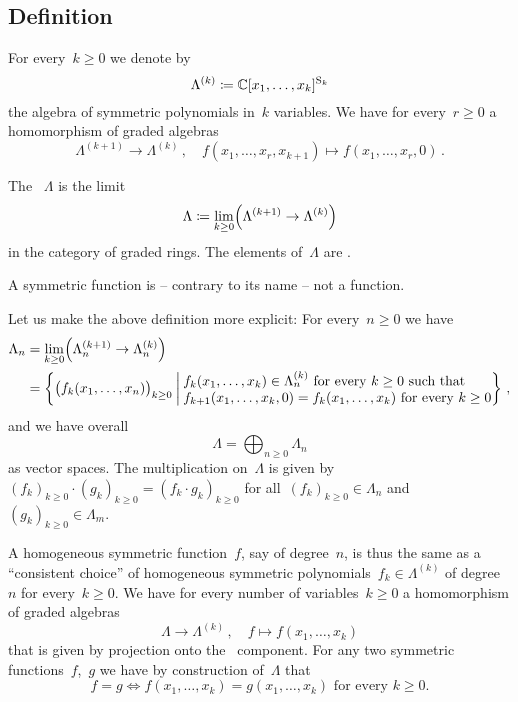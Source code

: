 \documentclass[a4paper,11pt]{scrartcl}
\begin{document}
\subsection{Definition}

For every~$k \geq 0$ we denote by
\[
  \Lambda^{(k)}
  \coloneqq
  \mathbb{C}[x_1, \dotsc, x_k]^{\mathrm{S}_k}
\]
the algebra of symmetric polynomials in~$k$ variables.
We have for every~$r \geq 0$ a homomorphism of graded algebras
\[
  \Lambda^{(k+1)} \to \Lambda^{(k)} \,,
  \quad
  f(x_1, \dotsc, x_r, x_{k+1})
  \mapsto
  f(x_1, \dotsc, x_r, 0) \,.
\]

\begin{definition}
  The ~$\Lambda$ is the limit
  \[
    \Lambda
    \coloneqq
    \lim_{k \geq 0}
    \Bigl( \Lambda^{(k+1)} \to \Lambda^{(k)} \Bigr)
  \]
  in the category of graded rings.
  The elements of~$\Lambda$ are .
\end{definition}

\begin{warning}
  A symmetric function is -- contrary to its name -- not a function.
\end{warning}

Let us make the above definition more explicit:
For every~$n \geq 0$ we have
\begin{align*}
  \Lambda_n
  &=
  \lim_{k \geq 0}
  \Bigl( \Lambda^{(k+1)}_n \to \Lambda^{(k)}_n \Bigr)
  \\
  &=
  \left\{
    \bigl( f_k(x_1, \dotsc, x_n) \bigr)_{k \geq 0}
    \suchthat*
    \begin{tabular}{@{}l@{}}
      $f_k(x_1, \dotsc, x_k) \in \Lambda^{(k)}_n$ for every~$k \geq 0$ such that \\
      $f_{k+1}(x_1, \dotsc, x_k, 0) = f_k(x_1, \dotsc, x_k)$ for every~$k \geq 0$
    \end{tabular}
  \right\} \,,
\end{align*}
and we have overall
\[
  \Lambda
  =
  \bigoplus_{n \geq 0} \Lambda_n
\]
as vector spaces.
The multiplication on~$\Lambda$ is given by~$(f_k)_{k \geq 0} \cdot (g_k)_{k \geq 0} = (f_k \cdot g_k)_{k \geq 0}$ for all~$(f_k)_{k \geq 0} \in \Lambda_n$ and~$(g_k)_{k \geq 0} \in \Lambda_m$.

A homogeneous symmetric function~$f$, say of degree~$n$, is thus the same as a \enquote{consistent choice} of homogeneous symmetric polynomials~$f_k \in \Lambda^{(k)}$ of degree~$n$ for every~$k \geq 0$.
We have for every number of variables~$k \geq 0$ a homomorphism of graded algebras
\[
  \Lambda \to \Lambda^{(k)} \,,
  \quad
  f \mapsto f(x_1, \dotsc, x_k)
\]
that is given by projection onto the~ component.
For any two symmetric functions~$f$,~$g$ we have by construction of~$\Lambda$ that
\[
  f = g
  \iff
  \text{$f(x_1, \dotsc, x_k) = g(x_1, \dotsc, x_k)$ for every~$k \geq 0$.}
\]
\end{document}
